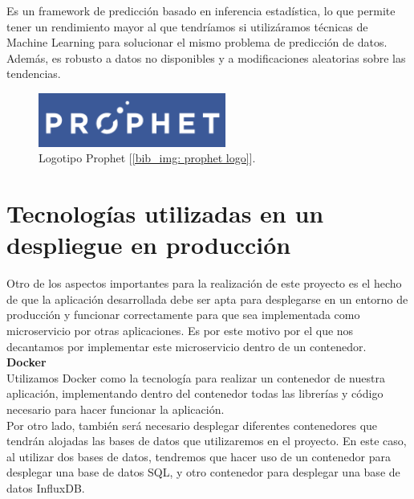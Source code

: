 \documentclass[a4paper, oneside, 12pt]{book}
\begin{document}
	\noindent Es un framework de predicción basado en inferencia estadística, lo que permite tener un rendimiento mayor al que tendríamos si utilizáramos técnicas de Machine Learning para solucionar el mismo problema de predicción de datos. Además, es robusto a datos no disponibles y a modificaciones aleatorias sobre las tendencias. 
	
	\begin{figure}[h!]
		\begin{center}
			\includegraphics[width=0.55\textwidth]{img/prophet_logo.png}
			\caption{Logotipo Prophet [\ref{bib_img: prophet logo}].}
			\label{img: prophet logo}
		\end{center}
	\end{figure}
	
	\pagebreak
	
	\section[Despliegue en producción]{Tecnologías utilizadas en un despliegue en producción}
	
	\noindent Otro de los aspectos importantes para la realización de este proyecto es el hecho de que la aplicación desarrollada debe ser apta para desplegarse en un entorno de producción y funcionar correctamente para que sea implementada como microservicio por otras aplicaciones. Es por este motivo por el que nos decantamos por implementar este microservicio dentro de un contenedor. \\
	
	\noindent \textbf{\large Docker} \\

	\noindent Utilizamos Docker como la tecnología para realizar un contenedor de nuestra aplicación, implementando dentro del contenedor todas las librerías y código necesario para hacer funcionar la aplicación. \\
	
	\noindent Por otro lado, también será necesario desplegar diferentes contenedores que tendrán alojadas las bases de datos que utilizaremos en el proyecto. En este caso, al utilizar dos bases de datos, tendremos que hacer uso de un contenedor para desplegar una base de datos SQL, y otro contenedor para desplegar una base de datos InfluxDB. \\ 
	
\end{document}
